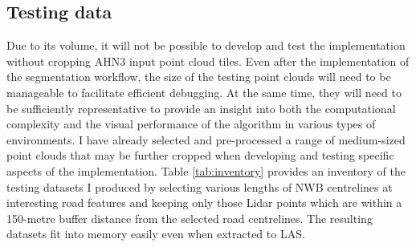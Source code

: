 \subsection{Testing data}
\label{sub:testingdata}

Due to its volume, it will not be possible to develop and test the implementation without cropping AHN3 input point cloud tiles. Even after the implementation of the segmentation workflow, the size of the testing point clouds will need to be manageable to facilitate efficient debugging. At the same time, they will need to be sufficiently representative to provide an insight into both the computational complexity and the visual performance of the algorithm in various types of environments. I have already selected and pre-processed a range of medium-sized point clouds that may be further cropped when developing and testing specific aspects of the implementation. Table \ref{tab:inventory} provides an inventory of the testing datasets I produced by selecting various lengths of NWB centrelines at interesting road features and keeping only those Lidar points which are within a 150-metre buffer distance from the selected road centrelines. The resulting datasets fit into memory easily even when extracted to LAS.


